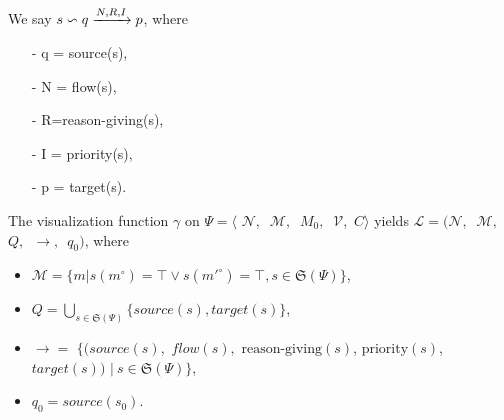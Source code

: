We say $s \backsim q\xrightarrow{N, R, I}p$, where
\begin{itemize}
 \item [-] q = source(s), 
 \item [-] N = flow(s), 
 \item [-] R=reason-giving(s), 
 \item [-] I = priority(s), 
 \item [-] p = target(s).
\end{itemize}

\begin{definition}[Visualization]
The visualization function $\gamma$ on $\Psi=\langle $ $\mathcal{N},\  $ $\mathcal{M},\ $ $M_{0},\ $ $\mathcal{V}$,\ $C$$\rangle$ %
yields $\mathcal{L}$$=$$($$\mathcal{N},\ $ $\mathcal{M},$\ $Q,$\ $\rightarrow, $\ $q_0)$, where %

\begin{itemize} 
  \item 
$\mathcal{M}=\{m|s(m^\circ)=\top \vee s(m'^\circ)=\top, s\in \mathfrak{S}(\Psi)\}$,
\item
$Q=\bigcup_{s\in \mathfrak{S}(\Psi)}\{source(s), target(s)\}$, 
\item $\rightarrow=$ $\{(source(s),$ $flow(s), $ $\text{reason-giving}(s)$, $\text{priority}(s)$, $target(s))$ $|\ s\in \mathfrak{S}(\Psi)\}$,
\item $q_0$$=source(s_0)$.
\end{itemize} 


\end{definition}
